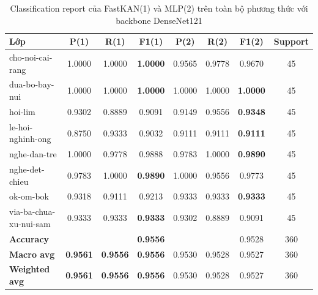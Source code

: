 \begin{table}[H]
\centering
\renewcommand{\arraystretch}{1.08}
\caption{\centering Classification report của FastKAN(1) và MLP(2) trên toàn bộ phương thức với backbone DenseNet121}
\begin{tabular}{lccccccc}
\hline
\textbf{Lớp} &
\textbf{P(1)} & \textbf{R(1)} & \textbf{F1(1)} &
\textbf{P(2)} & \textbf{R(2)} & \textbf{F1(2)} &
\textbf{Support} \\
\hline

cho-noi-cai-rang
& 1.0000 & 1.0000 & \textbf{1.0000}
& 0.9565 & 0.9778 & 0.9670 & 45 \\

dua-bo-bay-nui
& 1.0000 & 1.0000 & \textbf{1.0000}
& 1.0000 & 1.0000 & \textbf{1.0000} & 45 \\

hoi-lim
& 0.9302 & 0.8889 & 0.9091
& 0.9149 & 0.9556 & \textbf{0.9348} & 45 \\

le-hoi-nghinh-ong
& 0.8750 & 0.9333 & 0.9032
& 0.9111 & 0.9111 & \textbf{0.9111} & 45 \\

nghe-dan-tre
& 1.0000 & 0.9778 & 0.9888
& 0.9783 & 1.0000 & \textbf{0.9890} & 45 \\

nghe-det-chieu
& 0.9783 & 1.0000 & \textbf{0.9890}
& 1.0000 & 0.9556 & 0.9773 & 45 \\

ok-om-bok
& 0.9318 & 0.9111 & 0.9213
& 0.9333 & 0.9333 & \textbf{0.9333} & 45 \\

via-ba-chua-xu-nui-sam
& 0.9333 & 0.9333 & \textbf{0.9333}
& 0.9302 & 0.8889 & 0.9091 & 45 \\
\hline

\textbf{Accuracy}
& & & \textbf{0.9556}
& & & 0.9528 & 360 \\

\textbf{Macro avg}
& \textbf{0.9561} & \textbf{0.9556} & \textbf{0.9556}
& 0.9530 & 0.9528 & 0.9527 & 360 \\

\textbf{Weighted avg}
& \textbf{0.9561} & \textbf{0.9556} & \textbf{0.9556}
& 0.9530 & 0.9528 & 0.9527 & 360 \\
\hline
\end{tabular}
\end{table}

